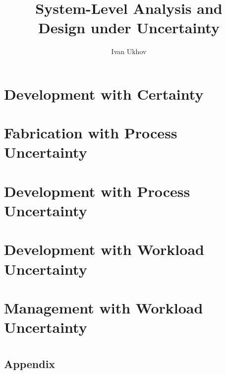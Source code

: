 \documentclass{thesis}
\title{
  System-Level Analysis and\\[0.3em]
  Design under Uncertainty
}
\author{Ivan Ukhov}
\begin{document}
\nocite{
  ukhov2012,
  ukhov2014a,
  ukhov2014b,
  ukhov2015,
  ukhov2017a,
  ukhov2017b,
  ukhov2017c,
}

\chapter{\introductiontitle}
\glsresetall
\newcommand{\inputsection}[1]{}


\chapter{Development with Certainty}
\glsresetall
\renewcommand{\inputsection}[1]{}


\chapter{Fabrication with Process Uncertainty}
\glsresetall
\renewcommand{\inputsection}[1]{}


\chapter{Development with Process Uncertainty}
\glsresetall
\renewcommand{\inputsection}[1]{}


\chapter{Development with Workload Uncertainty}
\glsresetall
\renewcommand{\inputsection}[1]{}


\chapter{Management with Workload Uncertainty}
\glsresetall
\renewcommand{\inputsection}[1]{}


\chapter{\conclusiontitle}
\glsresetall


\begin{appendices}
\chapter{Appendix}
\glsresetall
\renewcommand{\inputsection}[1]{}

\end{appendices}

\printbibliography
\end{document}

